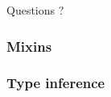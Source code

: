 \documentclass[xcolor=dvipsnames]{beamer}
\begin{document}
\begin{frame}
  \begin{center}
    Questions ?
  \end{center}
\end{frame}

\begin{frame}
  \frametitle{Mixins}
  
\end{frame}

\begin{frame}[fragile]
  \frametitle{Type inference}
  
  
\end{frame}
\end{document}
